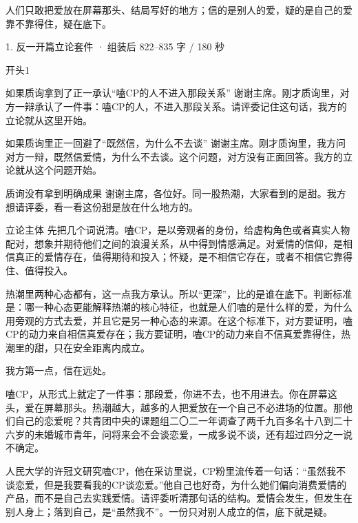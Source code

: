 \documentclass[script,con]{debate}
\begin{document}
\debatetitle
\begin{thesisbox}[全场一句话立论]人们只敢把爱放在屏幕那头、结局写好的地方；信的是别人的爱，疑的是自己的爱靠不靠得住，疑在底下。\end{thesisbox}

\begin{kit}{1. 反一开篇立论}{套件 · 组装后 822–835 字 / 180 秒}
\begin{pick}{开头}{1}
\begin{module}{如果质询拿到了正一承认“嗑CP的人不进入那段关系”}
谢谢主席。刚才质询里，对方一辩承认了一件事：嗑CP的人，不进入那段关系。请评委记住这句话，我方的立论就从这里开始。
\end{module}
\begin{module}{如果质询里正一回避了“既然信，为什么不去谈”}
谢谢主席。刚才质询里，我方问对方一辩，既然信爱情，为什么不去谈。这个问题，对方没有正面回答。我方的立论就从这个问题开始。
\end{module}
\begin{fallback}{质询没有拿到明确成果}
谢谢主席，各位好。同一股热潮，大家看到的是甜。我方想请评委，看一看这份甜是放在什么地方的。
\end{fallback}
\end{pick}
\begin{fixed}{立论主体}
先把几个词说清。嗑CP，是以旁观者的身份，给虚构角色或者真实人物配对，想象并期待他们之间的浪漫关系，从中得到情感满足。对爱情的信仰，是相信真正的爱情存在，值得期待和投入；怀疑，是不相信它存在，或者不相信它靠得住、值得投入。

热潮里两种心态都有，这一点我方承认。所以“更深”，比的是谁在底下。判断标准是：哪一种心态更能解释热潮的核心特征，也就是人们嗑的是什么样的爱，为什么用旁观的方式去爱，并且它是另一种心态的来源。在这个标准下，对方要证明，嗑CP的动力来自相信真爱存在；我方要证明，嗑CP的动力来自不信真爱靠得住，热潮里的甜，只在安全距离内成立。

我方第一点，信在远处。

嗑CP，从形式上就定了一件事：那段爱，你进不去，也不用进去。你在屏幕这头，爱在屏幕那头。热潮越大，越多的人把爱放在一个自己不必进场的位置。那他们自己的恋爱呢？共青团中央的课题组二〇二一年调查了两千九百多名十八到二十六岁的未婚城市青年，问将来会不会谈恋爱，一成多说不谈，还有超过四分之一说不确定。

人民大学的许冠文研究嗑CP，他在采访里说，CP粉里流传着一句话：“虽然我不谈恋爱，但是我要看我的CP谈恋爱。”他自己也好奇，为什么她们偏向消费爱情的产品，而不是自己去实践爱情。请评委听清那句话的结构。爱情会发生，但发生在别人身上；落到自己，是“虽然我不”。一份只对别人成立的信，底下就是疑。


\end{fixed}
\end{kit}
\end{document}
